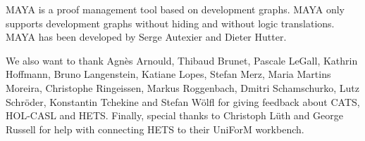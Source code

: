\documentclass{article}
\newcommand{\normalTEXTSC}[2]{{#1\scriptsize#2}}
\newcommand     {\MAYA}{\normalTEXTSC{M}{AYA}\xspace}
\newcommand     {\Hets}{\normalTEXTSC{H}{ETS}\xspace}
\newcommand     {\Cats}{\normalTEXTSC{C}{ATS}\xspace}
\begin{document}
\MAYA \cite{Autexier:2002:IHD,AutexierEtal02} is a proof management
tool based on development graphs.  \MAYA only supports development
graphs without hiding and without logic translations.  \MAYA has been
developed by Serge Autexier and Dieter Hutter.

We also want to thank Agn\`es Arnould, Thibaud Brunet, Pascale LeGall,
Kathrin Hoffmann, Bruno Langenstein, Katiane Lopes,
Stefan Merz, Maria Martins Moreira, Christophe
Ringeissen, Markus Roggenbach, Dmitri Schamschurko, Lutz Schr\"oder,
Konstantin Tchekine and Stefan W\"olfl
for giving feedback about \Cats, HOL-CASL and \Hets. Finally,
special thanks to Christoph L\"uth and George Russell
for help with connecting \Hets to their UniForM workbench.




\end{document}
